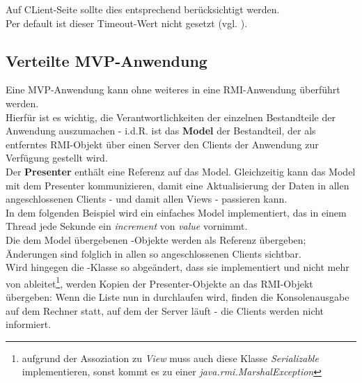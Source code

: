 \noindent
Auf CLient-Seite sollte dies entsprechend berücksichtigt werden.\\
Per default ist dieser Timeout-Wert nicht gesetzt (vgl. \cite[359]{Oec22}).

\subsection{Verteilte MVP-Anwendung}

Eine MVP-Anwendung kann ohne weiteres in eine RMI-Anwendung überführt werden.\\

\noindent
Hierfür ist es wichtig, die Verantwortlichkeiten der einzelnen Bestandteile der Anwendung auszumachen - i.d.R. ist das \textbf{Model} der Bestandteil, der als entferntes RMI-Objekt über einen Server den Clients der Anwendung zur Verfügung gestellt wird.\\

Der \textbf{Presenter} enthält eine Referenz auf das Model.
Gleichzeitig kann das Model mit dem Presenter kommunizieren, damit eine Aktualisierung der Daten in allen angeschlossenen Clients - und damit allen Views - passieren kann.\\

\noindent
In dem folgenden Beispiel wird ein einfaches Model implementiert, das in einem Thread jede Sekunde ein \textit{increment} von \textit{value} vornimmt.\\
Die dem Model übergebenen -Objekte werden als Referenz übergeben; Änderungen sind folglich in allen so angeschlossenen Clients sichtbar.\\
Wird hingegen die -Klasse so abgeändert, dass sie  implementiert und nicht mehr von  ableitet\footnote{
aufgrund der Assoziation zu {\textit{View}} muss auch diese Klasse \textit{Serializable} implementieren, sonst kommt es zu einer {\textit{java.rmi.MarshalException}}
}, werden Kopien der Presenter-Objekte an das RMI-Objekt übergeben: Wenn die Liste nun in  durchlaufen wird, finden die Konsolenausgabe auf dem Rechner statt, auf dem der Server läuft - die Clients werden nicht informiert.

